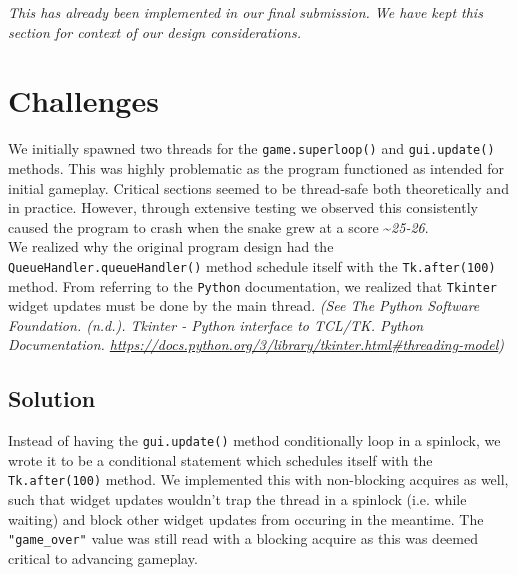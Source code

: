 \documentclass{article}
\begin{document}
\textit{This has already been implemented in our final submission. We have kept this section for context of our design considerations.}

\section{Challenges}

We initially spawned two threads for the \texttt{game.superloop()} and \texttt{gui.update()} methods.
This was highly problematic as the program functioned as intended for initial gameplay. Critical sections seemed to be thread-safe both theoretically and in practice.
However, through extensive testing we observed this consistently caused the program to crash when the snake grew at a score \textasciitilde \textit{25-26}. \\

We realized why the original program design had the \texttt{QueueHandler.queueHandler()} method schedule itself with the \texttt{Tk.after(100)} method.
From referring to the \texttt{Python} documentation, we realized that \texttt{Tkinter} widget updates must be done by the main thread.
\textit{(See The Python Software Foundation. (n.d.). Tkinter - Python interface to TCL/TK. Python Documentation. \href{https://docs.python.org/3/library/tkinter.html\#threading-model}{https://docs.python.org/3/library/tkinter.html\#threading-model})}

\subsection{Solution}

Instead of having the \texttt{gui.update()} method conditionally loop in a spinlock, we wrote it to be a conditional statement which schedules itself with the \texttt{Tk.after(100)} method.
We implemented this with non-blocking acquires as well, such that widget updates wouldn't trap the thread in a spinlock (i.e. while waiting) and block other widget updates from occuring in the meantime. The \texttt{"game\_over"} value was still read with
a blocking acquire as this was deemed critical to advancing gameplay.
\end{document}
